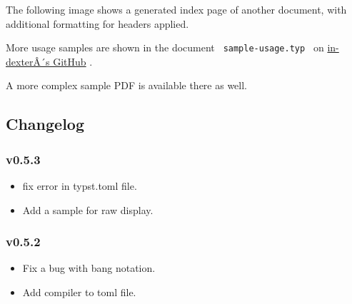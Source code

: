 \begin{Shaded}
\begin{Highlighting}[]






\NormalTok{\#columns(2)[}
\NormalTok{]}
\end{Highlighting}
\end{Shaded}

The following image shows a generated index page of another document,
with additional formatting for headers applied.


More usage samples are shown in the document
\texttt{\ sample-usage.typ\ } on
\href{https://github.com/RolfBremer/in-dexter}{in-dexterÂ´s GitHub} .

A more complex sample PDF is available there as well.

\subsection{Changelog}\label{changelog}

\subsubsection{v0.5.3}\label{v0.5.3}

\begin{itemize}
\tightlist
\item
  fix error in typst.toml file.
\item
  Add a sample for raw display.
\end{itemize}

\subsubsection{v0.5.2}\label{v0.5.2}

\begin{itemize}
\tightlist
\item
  Fix a bug with bang notation.
\item
  Add compiler to toml file.
\end{itemize}

